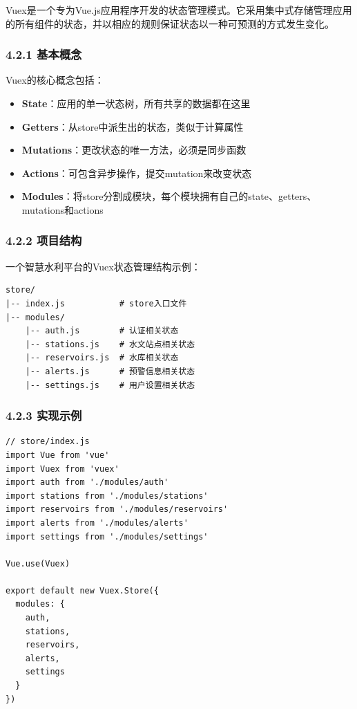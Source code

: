 Vuex是一个专为Vue.js应用程序开发的状态管理模式。它采用集中式存储管理应用的所有组件的状态，并以相应的规则保证状态以一种可预测的方式发生变化。

\subsubsection{4.2.1 基本概念}\label{ux57faux672cux6982ux5ff5}

Vuex的核心概念包括：

\begin{itemize}
\tightlist
\item
  \textbf{State}：应用的单一状态树，所有共享的数据都在这里
\item
  \textbf{Getters}：从store中派生出的状态，类似于计算属性
\item
  \textbf{Mutations}：更改状态的唯一方法，必须是同步函数
\item
  \textbf{Actions}：可包含异步操作，提交mutation来改变状态
\item
  \textbf{Modules}：将store分割成模块，每个模块拥有自己的state、getters、mutations和actions
\end{itemize}

\subsubsection{4.2.2 项目结构}\label{ux9879ux76eeux7ed3ux6784}

一个智慧水利平台的Vuex状态管理结构示例：

\begin{lstlisting}
store/
|-- index.js           # store入口文件
|-- modules/
    |-- auth.js        # 认证相关状态
    |-- stations.js    # 水文站点相关状态
    |-- reservoirs.js  # 水库相关状态
    |-- alerts.js      # 预警信息相关状态
    |-- settings.js    # 用户设置相关状态
\end{lstlisting}

\subsubsection{4.2.3 实现示例}\label{ux5b9eux73b0ux793aux4f8b}

\begin{lstlisting}
// store/index.js
import Vue from 'vue'
import Vuex from 'vuex'
import auth from './modules/auth'
import stations from './modules/stations'
import reservoirs from './modules/reservoirs'
import alerts from './modules/alerts'
import settings from './modules/settings'

Vue.use(Vuex)

export default new Vuex.Store({
  modules: {
    auth,
    stations,
    reservoirs,
    alerts,
    settings
  }
})
\end{lstlisting}

